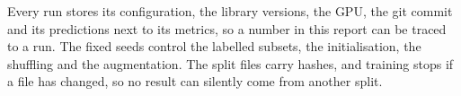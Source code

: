 \documentclass[conference]{IEEEtran}
\begin{document}
Every run stores its configuration, the library versions, the GPU, the git commit and its predictions next to its metrics, so a number in this report can be traced to a run. The fixed seeds control the labelled subsets, the initialisation, the shuffling and the augmentation. The split files carry hashes, and training stops if a file has changed, so no result can silently come from another split.
\end{document}
